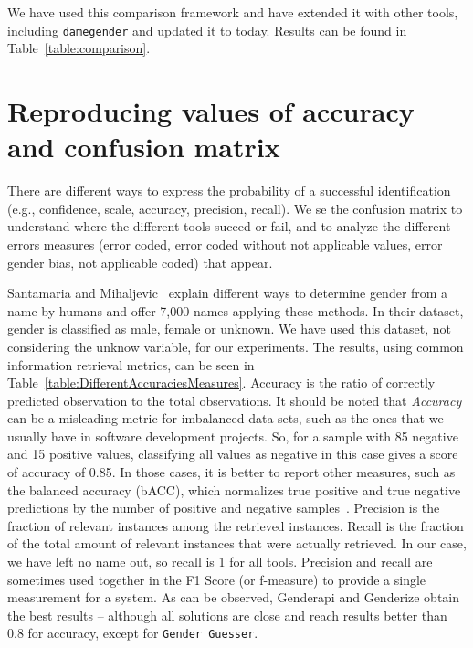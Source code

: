 \documentclass[a4paper]{article}
\begin{document}
We have used this comparison framework and have extended it with other tools, including \texttt{damegender} and updated it to today.
Results can be found in Table~\ref{table:comparison}.

\section{Reproducing values of accuracy and confusion matrix}

There are different ways to express the probability of a successful identification (e.g., confidence, scale, accuracy, precision, recall).
We se the confusion matrix to understand where the different tools suceed or fail, and to analyze the different errors measures (error coded, error coded without not applicable values, error gender bias, not applicable coded) that appear.

Santamaria and Mihaljevic~\cite{10.7717/peerj-cs.156} explain different ways to determine gender from a name by humans and offer 7,000 names applying these methods. 
In their dataset, gender is classified as male, female or unknown. 
We have used this dataset, not considering the unknow variable, for our experiments.
The results, using common information retrieval metrics, can be seen in Table~\ref{table:DifferentAccuraciesMeasures}.
Accuracy is the ratio of correctly predicted observation to the total observations.
It should be noted that \emph{Accuracy} can be a misleading metric for imbalanced data sets, such as the ones that we usually have in software development projects.
So, for a sample with 85 negative and 15 positive values, classifying all values as negative in this case gives a score of accuracy of 0.85.
In those cases, it is better to report other measures, such as the balanced accuracy (bACC), which normalizes true positive and true negative predictions by the number of positive and negative samples~\cite{mower2005prep}.
Precision is the fraction of relevant instances among the retrieved instances.
Recall is the fraction of the total amount of relevant instances that were actually retrieved.
In our case, we have left no name out, so recall is 1 for all tools.
Precision and recall are sometimes used together in the F1 Score (or f-measure) to provide a single measurement for a system.
As can be observed, Genderapi and Genderize obtain the best results -- although all solutions are close and reach results better than 0.8 for accuracy, except for \texttt{Gender Guesser}.

\end{document}
